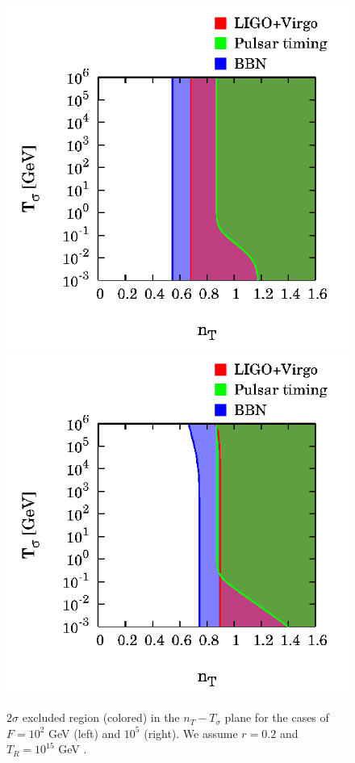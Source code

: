 \documentclass[11pt,a4paper,twoside]{book}
\begin{document}
\begin{figure}[h]
	\centering
	\includegraphics[width=0.45\linewidth, height=0.3\textheight]{Images/Chap3/Kurojanagi_Takahashi_Fig5A}
	\includegraphics[width=0.45\linewidth, height=0.3\textheight]{Images/Chap3/Kurojanagi_Takahashi_Fig5B}
	\caption{$ 2\sigma $ excluded region (colored) in the $ n_{T}-T_{\sigma} $ plane for the cases of $ F=10^{2} $ GeV (left) and $ 10^{5} $ (right). We assume $ r=0.2 $ and $ T_{R}=10^{15} $ GeV \cite{Chap3:BlueTiltedSpectrum}.}
	\label{fig:kurojanagitakahashifig5a}
\end{figure}
\end{document}

